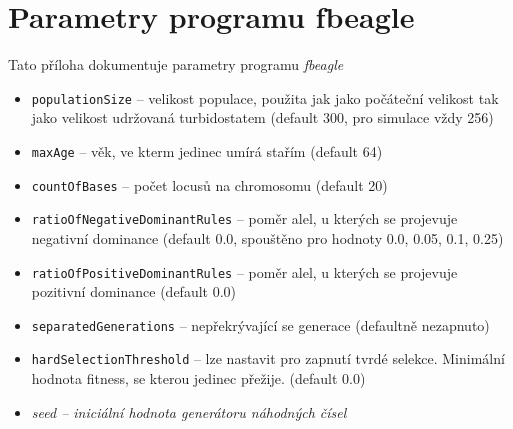 \section{Parametry programu fbeagle}
\label{sec:parameters}

Tato příloha dokumentuje parametry programu \textit{fbeagle}

\begin{itemize}
  \item \texttt{\-\-populationSize} -- velikost populace, použita jak jako počáteční velikost tak jako velikost udržovaná turbidostatem (default 300, pro simulace vždy 256)
  \item \texttt{\-\-maxAge} -- věk, ve kterm jedinec umírá stařím (default 64)
  \item \texttt{\-\-countOfBases} -- počet locusů na chromosomu (default 20)
  \item \texttt{\-\-ratioOfNegativeDominantRules} -- poměr alel, u kterých se projevuje negativní dominance (default 0.0, spouštěno pro hodnoty 0.0, 0.05, 0.1, 0.25)
  \item \texttt{\-\-ratioOfPositiveDominantRules} -- poměr alel, u kterých se projevuje pozitivní dominance (default 0.0)
  \item \texttt{\-\-separatedGenerations} -- nepřekrývající se generace (defaultně nezapnuto)
  \item \texttt{\-\-hardSelectionThreshold} -- lze nastavit pro zapnutí tvrdé selekce. Minimální hodnota fitness, se kterou jedinec přežije. (default 0.0)
  \item \textit{\-\-seed -- iniciální hodnota generátoru náhodných čísel}
\end{itemize}
